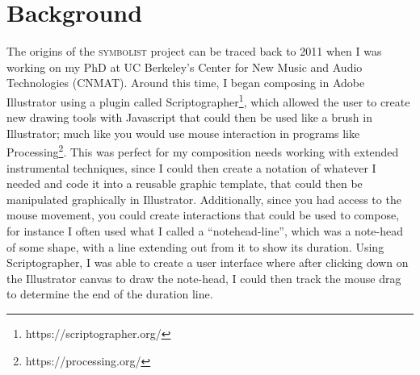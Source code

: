 \documentclass{article}
\title{\papertitle}
\def\symbolist{\textsc{symbolist}\xspace}
\begin{document}
%
\capstartfalse
\maketitle
\capstarttrue


\begin{abstract}

maybe already start with history here, and then continue to symbolist?

  \symbolist is an in-development application for experimental notation, with the goal of creating a working environment for developing symbolic notation for multimedia which can be interpreted and performed by electronics. The program aims to provide an open play space, with tools for experimentation, and thinking visually about relationships between representation and interpretation in media performance. 
In the paper we discuss the evaluation and re-design of the application based on the need for a bi-directional mapping framework for working with symbolic notation and its corresponding data representations.

\end{abstract}



\section{Background}\label{sec:background}

The origins of the \symbolist project can be traced back to 2011 when I was working on my PhD at UC Berkeley's Center for New Music and Audio Technologies (CNMAT). Around this time, I began composing in Adobe Illustrator using a plugin called Scriptographer\footnote{https://scriptographer.org/}, which allowed the user to create new drawing tools with Javascript that could then be used like a brush in Illustrator; much like you would use mouse interaction in programs like Processing\footnote{https://processing.org/}. This was perfect for my composition needs working with extended instrumental techniques, since I could then create a notation of whatever I needed and code it into a reusable graphic template, that could then be manipulated graphically in Illustrator. Additionally, since you had access to the mouse movement, you could create interactions that could be used to compose, for instance I often used what I called a ``notehead-line'', which was a note-head of some shape, with a line extending out from it to show its duration. Using Scriptographer, I was able to create a user interface where after clicking down on the Illustrator canvas to draw the note-head, I could then track the mouse drag to determine the end of the duration line.
\end{document}

